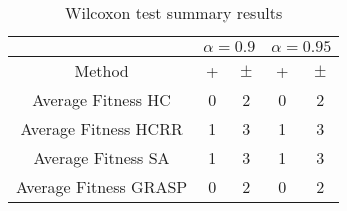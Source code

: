 \documentclass[a4paper,10pt]{article}
\begin{document}
\begin{table}[!htp]
\centering\scriptsize
\begin{tabular}{
|c|c|c|c|c|}
\hline
&\multicolumn{2}{c|}{$\alpha=0.9$} & \multicolumn{2}{c|}{$\alpha=0.95$}\\\hline
Method & + & $\pm$ & + & $\pm$ \\
\hline
Average Fitness HC     & 0 & 2 & 0 & 2\\
\hline
Average Fitness HCRR    & 1 & 3 & 1 & 3\\
\hline
Average Fitness SA   & 1 & 3 & 1 & 3\\
\hline
Average Fitness GRASP & 0 & 2 & 0 & 2\\
\hline

\end{tabular}
\caption{Wilcoxon test summary results}

\end{table}

 \clearpage 
\end{document}
